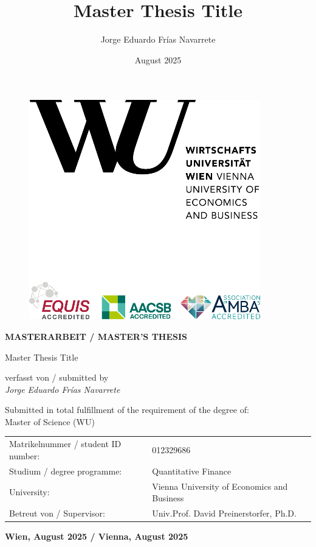 \documentclass[
  11pt,
  a4paper,
  openany]{scrreprt}
\title{Master Thesis Title}
\author{Jorge Eduardo Frías Navarrete}
\date{August 2025}
\begin{document}

\thispagestyle{empty}
\begin{figure}[h!]
    \raggedleft
    \includegraphics[scale=0.9]{pictures/WULogo.png}
\end{figure}

\vspace{1em}

\begin{center}
    \textbf{\huge MASTERARBEIT / MASTER’S THESIS} \\
    \vspace{1.5cm}

    \LARGE Master Thesis Title \\
    \vspace{2.5cm}
    
    \normalsize verfasst von / submitted by \\
    \vspace{0.5cm}
        \textit{\Large Jorge Eduardo Frías Navarrete \\}
        \vspace{2cm}
    
    Submitted in total fulfillment of the requirement of the degree of: \\
    \Large Master of Science (WU)
        \\
\vspace{1cm}
\normalsize

    \begin{tabular}{ll}
        Matrikelnummer / student ID number: & 012329686 \\
        Studium / degree programme: & Quantitative Finance \\
        University: & Vienna University of Economics and Business \\
        Betreut von / Supervisor: & Univ.Prof. David Preinerstorfer, Ph.D. \\
    \end{tabular}
    \vspace{2cm}
    
    \textbf{Wien, August 2025 / Vienna, August 2025}
\end{center}
\end{document}
